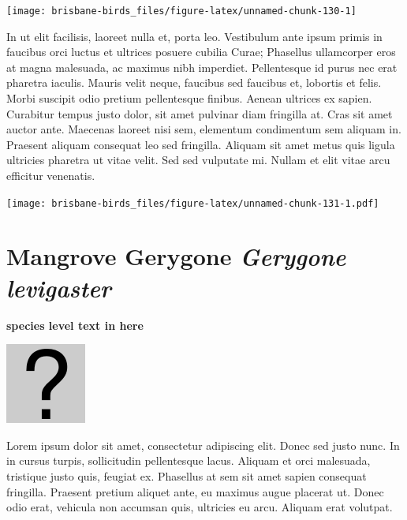 \documentclass[]{book}
\let\origfigure\figure
\let\endorigfigure\endfigure
\renewenvironment{figure}[1][2] {
  \expandafter\origfigure\expandafter[H]
} {
  \endorigfigure
}
\begin{document}
\begin{figure}
\texttt{[image: brisbane-birds\_files/figure-latex/unnamed-chunk-130-1]} \caption{insert figure caption}\label{fig:unnamed-chunk-130}
\end{figure}

In ut elit facilisis, laoreet nulla et, porta leo. Vestibulum ante ipsum
primis in faucibus orci luctus et ultrices posuere cubilia Curae;
Phasellus ullamcorper eros at magna malesuada, ac maximus nibh
imperdiet. Pellentesque id purus nec erat pharetra iaculis. Mauris velit
neque, faucibus sed faucibus et, lobortis et felis. Morbi suscipit odio
pretium pellentesque finibus. Aenean ultrices ex sapien. Curabitur
tempus justo dolor, sit amet pulvinar diam fringilla at. Cras sit amet
auctor ante. Maecenas laoreet nisi sem, elementum condimentum sem
aliquam in. Praesent aliquam consequat leo sed fringilla. Aliquam sit
amet metus quis ligula ultricies pharetra ut vitae velit. Sed sed
vulputate mi. Nullam et elit vitae arcu efficitur venenatis.

\begin{figure}
\centering
\texttt{[image: brisbane-birds\_files/figure-latex/unnamed-chunk-131-1.pdf]}
\caption{\label{fig:unnamed-chunk-131}insert figure caption}
\end{figure}

\section{\texorpdfstring{Mangrove Gerygone \emph{Gerygone
levigaster}}{Mangrove Gerygone Gerygone levigaster}}\label{mangrove-gerygone-gerygone-levigaster}

\textbf{species level text in here}

\begin{figure}
\centering
\includegraphics{assets/missing.png}
\caption{No image for species}
\end{figure}

Lorem ipsum dolor sit amet, consectetur adipiscing elit. Donec sed justo
nunc. In in cursus turpis, sollicitudin pellentesque lacus. Aliquam et
orci malesuada, tristique justo quis, feugiat ex. Phasellus at sem sit
amet sapien consequat fringilla. Praesent pretium aliquet ante, eu
maximus augue placerat ut. Donec odio erat, vehicula non accumsan quis,
ultricies eu arcu. Aliquam erat volutpat.
\end{document}
